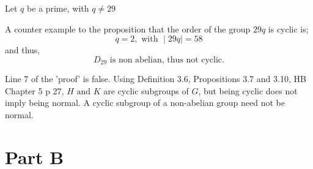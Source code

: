 \documentclass{tufte-handout}
\begin{document}
\begin{question}

\qpart

Let \( q \) be a prime, with \( q \neq 29 \)

A counter example to the proposition that the order of the group \( 29q \) is cyclic is;
\[ q = 2, \text{ with } \mid 29q \mid = 58 \]
and thus,
\[ D_{29} \text{ is non abelian, thus not cyclic.} \]

\vspace{2cm}

\qpart

Line \( 7 \) of the 'proof' is false. Using \textup{Definition 3.6, Propositions 3.7 and 3.10, HB Chapter 5 p 27},
\( H \text{ and } K \) are cyclic subgroups of \( G \), but being cyclic does not imply being normal.
A cyclic subgroup of a non-abelian group need not be normal.

\end{question}

\section{Part B}

\end{document}

